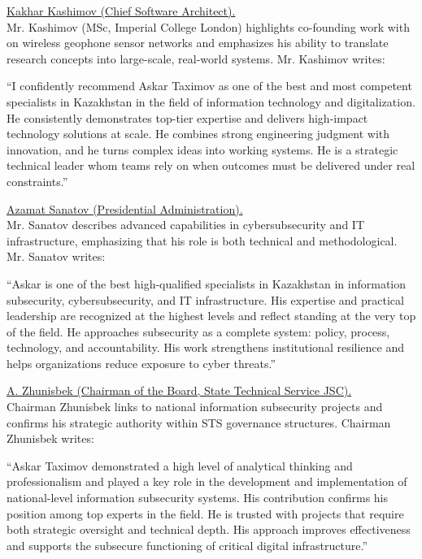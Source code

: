 \noindent\underline{Kakhar Kashimov (Chief Software Architect).} \\
Mr. Kashimov (MSc, Imperial College London) highlights co-founding work with \mrl{} on wireless geophone sensor networks and emphasizes his ability to translate research concepts into large-scale, real-world systems. Mr. Kashimov writes:
\begin{fullquote}
``I confidently recommend Askar Taximov as one of the best and most competent specialists in Kazakhstan in the field of information technology and digitalization. He consistently demonstrates top-tier expertise and delivers high-impact technology solutions at scale. He combines strong engineering judgment with innovation, and he turns complex ideas into working systems. He is a strategic technical leader whom teams rely on when outcomes must be delivered under real constraints.''  
\end{fullquote}

\noindent\underline{Azamat Sanatov (Presidential Administration).} \\
Mr. Sanatov describes \mrls advanced capabilities in cybersubsecurity and IT infrastructure, emphasizing that his role is both technical and methodological. Mr. Sanatov writes:
\begin{fullquote}
``Askar is one of the best high-qualified specialists in Kazakhstan in information subsecurity, cybersubsecurity, and IT infrastructure. His expertise and practical leadership are recognized at the highest levels and reflect standing at the very top of the field. He approaches subsecurity as a complete system: policy, process, technology, and accountability. His work strengthens institutional resilience and helps organizations reduce exposure to cyber threats.''  
\end{fullquote}

\noindent\underline{A. Zhunisbek (Chairman of the Board, State Technical Service JSC).} \\
Chairman Zhunisbek links \mrl{} to national information subsecurity projects and confirms his strategic authority within STS governance structures. Chairman Zhunisbek writes:
\begin{fullquote}
``Askar Taximov demonstrated a high level of analytical thinking and professionalism and played a key role in the development and implementation of national-level information subsecurity systems. His contribution confirms his position among top experts in the field. He is trusted with projects that require both strategic oversight and technical depth. His approach improves effectiveness and supports the subsecure functioning of critical digital infrastructure.''  
\end{fullquote}

